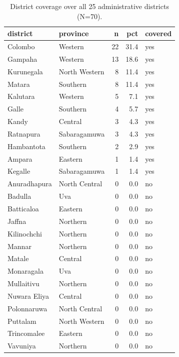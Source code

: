 \begin{table}
\caption{District coverage over all 25 administrative districts (N=70).}
\label{tab:district_coverage}
\begin{tabular}{llrrl}
\toprule
district & province & n & pct & covered \\
\midrule
Colombo & Western & 22 & 31.4 & yes \\
Gampaha & Western & 13 & 18.6 & yes \\
Kurunegala & North Western & 8 & 11.4 & yes \\
Matara & Southern & 8 & 11.4 & yes \\
Kalutara & Western & 5 & 7.1 & yes \\
Galle & Southern & 4 & 5.7 & yes \\
Kandy & Central & 3 & 4.3 & yes \\
Ratnapura & Sabaragamuwa & 3 & 4.3 & yes \\
Hambantota & Southern & 2 & 2.9 & yes \\
Ampara & Eastern & 1 & 1.4 & yes \\
Kegalle & Sabaragamuwa & 1 & 1.4 & yes \\
Anuradhapura & North Central & 0 & 0.0 & no \\
Badulla & Uva & 0 & 0.0 & no \\
Batticaloa & Eastern & 0 & 0.0 & no \\
Jaffna & Northern & 0 & 0.0 & no \\
Kilinochchi & Northern & 0 & 0.0 & no \\
Mannar & Northern & 0 & 0.0 & no \\
Matale & Central & 0 & 0.0 & no \\
Monaragala & Uva & 0 & 0.0 & no \\
Mullaitivu & Northern & 0 & 0.0 & no \\
Nuwara Eliya & Central & 0 & 0.0 & no \\
Polonnaruwa & North Central & 0 & 0.0 & no \\
Puttalam & North Western & 0 & 0.0 & no \\
Trincomalee & Eastern & 0 & 0.0 & no \\
Vavuniya & Northern & 0 & 0.0 & no \\
\bottomrule
\end{tabular}
\end{table}
